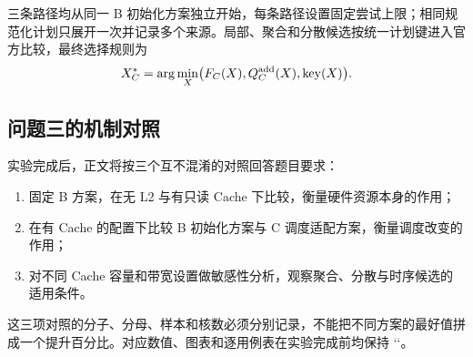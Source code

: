 三条路径均从同一 B 初始化方案独立开始，每条路径设置固定尝试上限；相同规范化计划只展开一次并记录多个来源。局部、聚合和分散候选按统一计划键进入官方比较，最终选择规则为
\begin{equation}
X_C^*=\arg\min_X\bigl(F_C(X),Q_C^{\rm add}(X),\operatorname{key}(X)\bigr).
\end{equation}

\subsection{问题三的机制对照}
实验完成后，正文将按三个互不混淆的对照回答题目要求：
\begin{enumerate}
\item 固定 B 方案，在无 L2 与有只读 Cache 下比较，衡量硬件资源本身的作用；
\item 在有 Cache 的配置下比较 B 初始化方案与 C 调度适配方案，衡量调度改变的作用；
\item 对不同 Cache 容量和带宽设置做敏感性分析，观察聚合、分散与时序候选的适用条件。
\end{enumerate}
这三项对照的分子、分母、样本和核数必须分别记录，不能把不同方案的最好值拼成一个提升百分比。对应数值、图表和逐用例表在实验完成前均保持 `\pending`。
